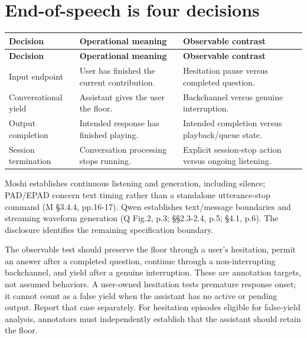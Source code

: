 \documentclass[11pt]{article}
\begin{document}
\newpage
\section{End-of-speech is four decisions}

\begingroup
\small
\begin{longtable}{
  >{\raggedright\arraybackslash}p{3.0cm}
  >{\raggedright\arraybackslash}p{5.8cm}
  >{\raggedright\arraybackslash}p{6.1cm}
}
\toprule
\textbf{Decision} & \textbf{Operational meaning} & \textbf{Observable contrast} \\
\midrule
\endfirsthead
\toprule
\textbf{Decision} & \textbf{Operational meaning} & \textbf{Observable contrast} \\
\midrule
\endhead
\bottomrule
\endfoot
Input endpoint & User has finished the current contribution. & Hesitation pause versus completed question. \\
Conversational yield & Assistant gives the user the floor. & Backchannel versus genuine interruption. \\
Output completion & Intended response has finished playing. & Intended completion versus playback/queue state. \\
Session termination & Conversation processing stops running. & Explicit session-stop action versus ongoing listening. \\
\end{longtable}
\endgroup

Moshi establishes continuous listening and generation, including silence; PAD/EPAD concern text timing rather than a standalone utterance-stop command (M §3.4.4, pp.16-17). Qwen establishes text/message boundaries and streaming waveform generation (Q Fig.2, p.3; §§2.3-2.4, p.5; §4.1, p.6). The disclosure identifies the remaining specification boundary.

The observable test should preserve the floor through a user's hesitation, permit an answer after a completed question, continue through a non-interrupting backchannel, and yield after a genuine interruption. These are annotation targets, not assumed behaviors. A user-owned hesitation tests premature response onset; it cannot count as a false yield when the assistant has no active or pending output. Report that case separately. For hesitation episodes eligible for false-yield analysis, annotators must independently establish that the assistant should retain the floor.
\end{document}

